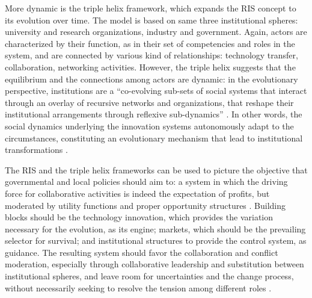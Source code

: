 More dynamic is the triple helix framework, which expands the RIS concept to its evolution over time. The model is based on same three  institutional spheres: university and research organizations, industry and government. Again, actors are characterized by their function, as in their set of competencies and roles in the system, and are connected by various kind of relationships: technology transfer, collaboration, networking activities. However, the triple helix suggests that the equilibrium and the connections among actors are dynamic: in the evolutionary perspective, institutions are a \enquote{co-evolving sub-sets of social systems that interact through an overlay of recursive networks and organizations, that reshape their institutional arrangements through reflexive sub-dynamics} \citep{Ranga2013}. In other words, the social dynamics underlying the innovation systems autonomously adapt to the circumstances, constituting an evolutionary mechanism that lead to institutional transformations \citep{Etzkowitz2000}.

The RIS and the triple helix frameworks can be used to picture the objective that governmental and local policies should aim to: a system in which the driving force for collaborative activities is indeed the expectation of profits, but moderated by utility functions and proper opportunity structures \citep{Etzkowitz2000}. Building blocks should be the technology innovation, which provides the variation necessary for the evolution, as its engine; markets, which should be the prevailing selector for survival; and institutional structures to provide the control system, as guidance. The resulting system should favor the collaboration and conflict moderation, especially through collaborative leadership and substitution between institutional spheres, and leave room for uncertainties and the change process, without necessarily seeking to resolve the tension among different roles \citep{Ranga2013}. 
